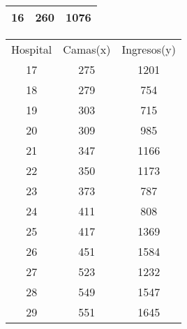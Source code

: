 ﻿\documentclass{beamer}
\begin{document}
\begin{frame}[allowframebreaks*]
\begin{tabular}{|c|c|c|}
                                                                                  \textbf{16} & \textbf{260} & \textbf{1076} \\
                                                                                  \hline
                                                                                \end{tabular}
\begin{tabular}{|c|c|c|}
                                                                                  \hline
                                                                                  Hospital & Camas(x) & Ingresos(y) \\
                                                                                  17 & 275 & 1201 \\
                                                                                  18 & 279 & 754 \\
                                                                                  19 & 303 & 715 \\
                                                                                  20 & 309 & 985 \\
                                                                                  21 & 347 & 1166 \\
                                                                                  22 & 350 & 1173 \\
                                                                                  23 & 373 & 787 \\                                                                 24 & 411 & 808 \\
                                                                                  25 & 417 & 1369 \\
                                                                                  26 & 451 & 1584 \\
                                                                                  27 & 523 & 1232 \\
                                                                                  28 & 549 & 1547 \\
                                                                                  29 & 551 & 1645 \\

\end{tabular}
\end{frame}
\end{document}

